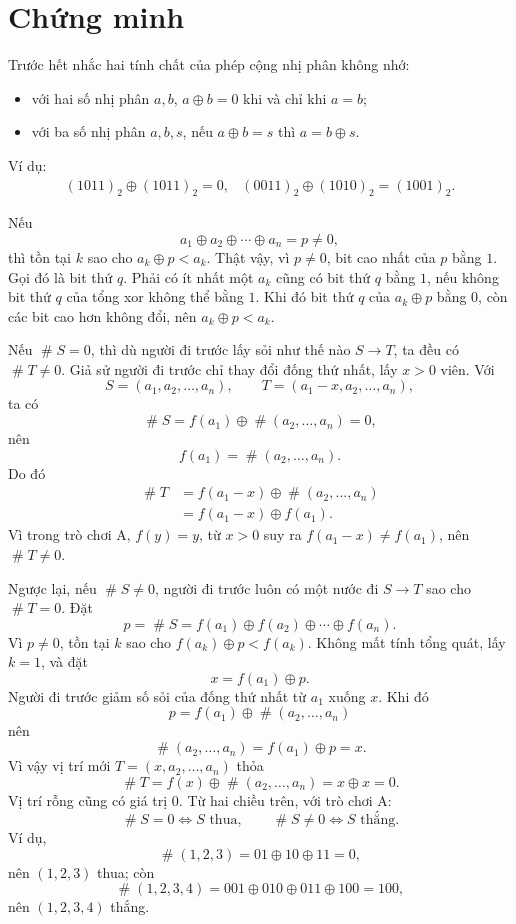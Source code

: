 \documentclass[11pt]{article}
\newcommand{\nimadd}{\oplus}
\newcommand{\val}[1]{\mathop{\#}\!#1}
\begin{document}
\section{Chứng minh}

Trước hết nhắc hai tính chất của phép cộng nhị phân không nhớ:
\begin{itemize}
  \item với hai số nhị phân \(a,b\), \(a\nimadd b=0\) khi và chỉ khi \(a=b\);
  \item với ba số nhị phân \(a,b,s\), nếu \(a\nimadd b=s\) thì
  \(a=b\nimadd s\).
\end{itemize}
Ví dụ:
\[
\begin{array}{cc}
(1011)_2\nimadd(1011)_2=0, &
(0011)_2\nimadd(1010)_2=(1001)_2.
\end{array}
\]

Nếu
\[
  a_1\nimadd a_2\nimadd\cdots\nimadd a_n=p\ne0,
\]
thì tồn tại \(k\) sao cho \(a_k\nimadd p<a_k\). Thật vậy, vì \(p\ne0\), bit
cao nhất của \(p\) bằng \(1\). Gọi đó là bit thứ \(q\). Phải có ít nhất một
\(a_k\) cũng có bit thứ \(q\) bằng \(1\), nếu không bit thứ \(q\) của tổng
xor không thể bằng \(1\). Khi đó bit thứ \(q\) của \(a_k\nimadd p\) bằng
\(0\), còn các bit cao hơn không đổi, nên \(a_k\nimadd p<a_k\).

Nếu \(\val{S}=0\), thì dù người đi trước lấy sỏi như thế nào \(S\to T\), ta
đều có \(\val{T}\ne0\). Giả sử người đi trước chỉ thay đổi đống thứ nhất, lấy
\(x>0\) viên. Với
\[
  S=(a_1,a_2,\ldots,a_n),\qquad
  T=(a_1-x,a_2,\ldots,a_n),
\]
ta có
\[
  \val{S}=f(a_1)\nimadd\val{(a_2,\ldots,a_n)}=0,
\]
nên
\[
  f(a_1)=\val{(a_2,\ldots,a_n)}.
\]
Do đó
\[
\begin{aligned}
  \val{T}
  &=f(a_1-x)\nimadd\val{(a_2,\ldots,a_n)}\\
  &=f(a_1-x)\nimadd f(a_1).
\end{aligned}
\]
Vì trong trò chơi A, \(f(y)=y\), từ \(x>0\) suy ra \(f(a_1-x)\ne f(a_1)\),
nên \(\val{T}\ne0\).

Ngược lại, nếu \(\val{S}\ne0\), người đi trước luôn có một nước đi \(S\to T\)
sao cho \(\val{T}=0\). Đặt
\[
  p=\val{S}=f(a_1)\nimadd f(a_2)\nimadd\cdots\nimadd f(a_n).
\]
Vì \(p\ne0\), tồn tại \(k\) sao cho \(f(a_k)\nimadd p<f(a_k)\). Không mất
tính tổng quát, lấy \(k=1\), và đặt
\[
  x=f(a_1)\nimadd p.
\]
Người đi trước giảm số sỏi của đống thứ nhất từ \(a_1\) xuống \(x\). Khi đó
\[
  p=f(a_1)\nimadd\val{(a_2,\ldots,a_n)}
\]
nên
\[
  \val{(a_2,\ldots,a_n)}=f(a_1)\nimadd p=x.
\]
Vì vậy vị trí mới \(T=(x,a_2,\ldots,a_n)\) thỏa
\[
  \val{T}=f(x)\nimadd\val{(a_2,\ldots,a_n)}=x\nimadd x=0.
\]
Vị trí rỗng cũng có giá trị \(0\). Từ hai chiều trên, với trò chơi A:
\[
  \val{S}=0 \Longleftrightarrow S\text{ thua},\qquad
  \val{S}\ne0 \Longleftrightarrow S\text{ thắng}.
\]
Ví dụ,
\[
  \val{(1,2,3)}=01\nimadd10\nimadd11=0,
\]
nên \((1,2,3)\) thua; còn
\[
  \val{(1,2,3,4)}=001\nimadd010\nimadd011\nimadd100=100,
\]
nên \((1,2,3,4)\) thắng.
\end{document}
